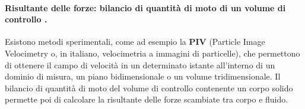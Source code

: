 % 

\paragraph{Risultante delle forze: bilancio di quantità di moto di un volume di controllo .}
Esistono metodi sperimentali, come ad esempio la \textbf{PIV} (Particle Image Velocimetry o, in italiano, velocimetria a immagini di particelle), che permettono di ottenere il campo di velocità in un determinato istante all'interno di un dominio di misura, un piano bidimensionale o un volume tridimensionale.
Il bilancio di quantità di moto del volume di controllo contenente un corpo solido permette poi di calcolare la risultante delle forze scambiate tra corpo e fluido.

